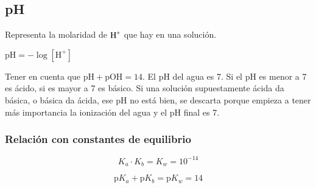 \subsection*{pH}

Representa la molaridad de $\ce{H^+}$ que hay en una solución.

\hfil$\text{pH} = -\log [\text{H}^+]$\hfil

Tener en cuenta que $\text{pH} + \text{pOH} = 14$. El pH del agua es 7. Si el pH es menor a 7 es ácido, si es mayor a 7 es básico. Si una solución supuestamente ácida da básica, o básica da ácida, ese pH no está bien, se descarta porque empieza a tener más importancia la ionización del agua y el pH final es 7.

\subsubsection*{Relación con constantes de equilibrio}

$$K_a \cdot K_b = K_w = 10^{-14}$$

$$\text{p}K_a + \text{p}K_b = \text{p}K_w = 14$$